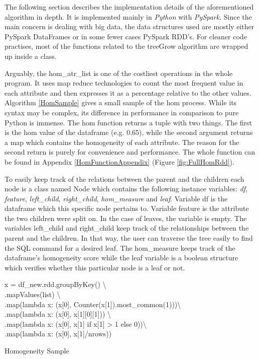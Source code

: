 \documentclass[sigconf]{acmart}
\begin{document}
The following section describes the implementation details of the aforementioned algorithm in depth. It is implemented mainly in \textit{Python} with \textit{PySpark}.
Since the main concern is dealing with big data, the data structures used are mostly either PySpark DataFrames or in some fewer cases PySpark RDD's. For cleaner code practises, most of the functions related to the treeGrow algorithm are wrapped up inside a class.

Arguably, the hom\_atr\_list is one of the costliest operations in the whole program. It uses map reduce technologies to count the most frequent value in each attribute and then expresses it as a percentage relative to the other values. Algorithm \ref{HomSample} gives a small sample of the hom process. While its syntax may be complex, its difference in performance in comparison to pure Python is immense. The hom function returns a tuple with two things. The first is the hom value of the dataframe (e.g. 0.65), while the second argument returns a map which contains the homogeneity of each attribute. The reason for the second return is purely for convenience and performance. The whole function can be found in Appendix \ref{HomFunctionAppendix} (Figure \ref{fig:FullHomRdd}).


To easily keep track of the relations between the parent and the children each node is a class named Node which contains the following instance variables:  \textit{df}, \textit{feature}, \textit{left\_child}, \textit{right\_child}, \textit{hom\_measure} and \textit{leaf}. Variable df is the dataframe which this specific node pertains to. Variable feature is the attribute the two children were split on. In the case of leaves, the variable is empty. The variables left\_child and right\_child keep track of the relationships between the parent and the children. In that way, the user can traverse the tree easily to find the SQL command for a desired leaf. The hom\_measure keeps track of the dataframe's homogeneity score while the leaf variable is a boolean structure which verifies whether this particular node is a leaf or not.


\begin{algorithm}[h!]

 x = df\_new.rdd.groupByKey() \textbackslash\\
                            .mapValues(list) \textbackslash\\
                            .map(lambda x: (x[0], Counter(x[1]).most\_common(1)))\textbackslash\\
                            .map(lambda x: (x[0], x[1][0][1])) \textbackslash\\
                            .map(lambda x: (x[0], x[1] if x[1] > 1 else 0))\textbackslash\\
                            .map(lambda x: (x[0], x[1]/nrows))\;
 \caption{Homogeneity Sample}\label{HomSample}
\end{algorithm}
\end{document}
